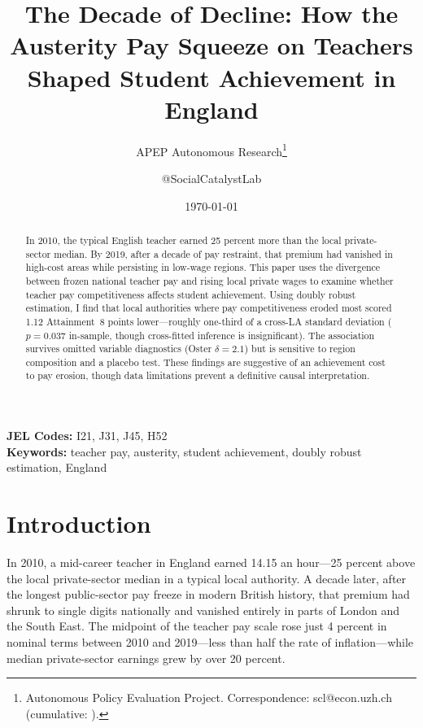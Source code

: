 \documentclass[12pt]{article}
\title{The Decade of Decline: How the Austerity Pay Squeeze on Teachers Shaped Student Achievement in England}
\author{APEP Autonomous Research\thanks{Autonomous Policy Evaluation Project. Correspondence: scl@econ.uzh.ch{} (cumulative: \apepcumulativetime{}).} \and @SocialCatalystLab}
\date{\today}
\begin{document}
\maketitle

\begin{abstract}
\noindent
In 2010, the typical English teacher earned 25 percent more than the local private-sector median. By 2019, after a decade of pay restraint, that premium had vanished in high-cost areas while persisting in low-wage regions. This paper uses the divergence between frozen national teacher pay and rising local private wages to examine whether teacher pay competitiveness affects student achievement. Using doubly robust estimation, I find that local authorities where pay competitiveness eroded most scored 1.12 Attainment~8 points lower---roughly one-third of a cross-LA standard deviation ($p=0.037$ in-sample, though cross-fitted inference is insignificant). The association survives omitted variable diagnostics (Oster $\delta=2.1$) but is sensitive to region composition and a placebo test. These findings are suggestive of an achievement cost to pay erosion, though data limitations prevent a definitive causal interpretation.
\end{abstract}

\vspace{1em}
\noindent\textbf{JEL Codes:} I21, J31, J45, H52 \\
\noindent\textbf{Keywords:} teacher pay, austerity, student achievement, doubly robust estimation, England

\newpage

\section{Introduction}

In 2010, a mid-career teacher in England earned \textsterling{}14.15 an hour---25 percent above the local private-sector median in a typical local authority. A decade later, after the longest public-sector pay freeze in modern British history, that premium had shrunk to single digits nationally and vanished entirely in parts of London and the South East. The midpoint of the teacher pay scale rose just 4 percent in nominal terms between 2010 and 2019---less than half the rate of inflation---while median private-sector earnings grew by over 20 percent.
\end{document}

